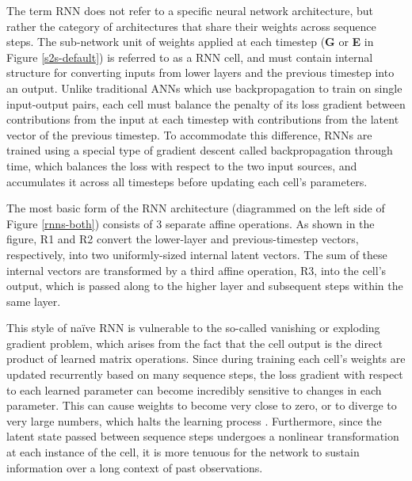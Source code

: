 The term RNN does not refer to a specific neural network architecture, but rather the category of architectures that share their weights across sequence steps. The sub-network unit of weights applied at each timestep (\textbf{G} or \textbf{E} in Figure \ref{s2s-default}) is referred to as a RNN cell, and must contain internal structure for converting inputs from lower layers and the previous timestep into an output. Unlike traditional ANNs which use backpropagation to train on single input-output pairs, each cell must balance the penalty of its loss gradient between contributions from the input at each timestep with contributions from the latent vector of the previous timestep. To accommodate this difference, RNNs are trained using a special type of gradient descent called backpropagation through time, which balances the loss with respect to the two input sources, and accumulates it across all timesteps before updating each cell's parameters.

The most basic form of the RNN architecture (diagrammed on the left side of Figure \ref{rnns-both}) consists of 3 separate affine operations. As shown in the figure, R1 and R2 convert the lower-layer and previous-timestep vectors, respectively, into two uniformly-sized internal latent vectors. The sum of these internal vectors are transformed by a third affine operation, R3, into the cell's output, which is passed along to the higher layer and subsequent steps within the same layer.

This style of na\"ive RNN is vulnerable to the so-called vanishing or exploding gradient problem, which arises from the fact that the cell output is the direct product of learned matrix operations. Since during training each cell's weights are updated recurrently based on many sequence steps, the loss gradient with respect to each learned parameter can become incredibly sensitive to changes in each parameter. This can cause weights to become very close to zero, or to diverge to very large numbers, which halts the learning process \parencite{mozer_focused_1995}. Furthermore, since the latent state passed between sequence steps undergoes a nonlinear transformation at each instance of the cell, it is more tenuous for the network to sustain information over a long context of past observations.

